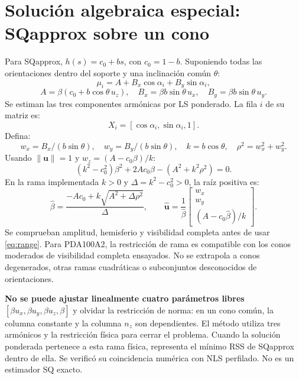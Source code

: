 \documentclass[11pt,a4paper]{article}
\begin{document}
\section{Solución algebraica especial: SQapprox sobre un cono}
Para SQapprox, $h(s)=c_0+bs$, con $c_0=1-b$. Suponiendo todas las orientaciones dentro del soporte y una inclinación común $\theta$:
\begin{equation}
 \mu_i=A+B_x\cos\alpha_i+B_y\sin\alpha_i,
\end{equation}
\begin{equation}
 A=\beta(c_0+b\cos\theta\,u_z),\quad
 B_x=\beta b\sin\theta\,u_x,\quad B_y=\beta b\sin\theta\,u_y.
\end{equation}
Se estiman las tres componentes armónicas por LS ponderado. La fila $i$ de su matriz es:
\begin{equation}
 X_i=[\cos\alpha_i,\sin\alpha_i,1].
\end{equation}
Defina:
\begin{equation}
 w_x=B_x/(b\sin\theta),\quad w_y=B_y/(b\sin\theta),\quad
 k=b\cos\theta,\quad \rho^2=w_x^2+w_y^2.
\end{equation}
Usando $\|\mathbf u\|=1$ y $w_z=(A-c_0\beta)/k$:
\begin{equation}
 (k^2-c_0^2)\beta^2+2Ac_0\beta-(A^2+k^2\rho^2)=0.
\end{equation}
En la rama implementada $k>0$ y $\Delta=k^2-c_0^2>0$, la raíz positiva es:
\begin{equation}
 \boxed{\hat\beta=\frac{-Ac_0+k\sqrt{A^2+\Delta\rho^2}}{\Delta}},\qquad
 \hat{\mathbf u}=\frac1{\hat\beta}\begin{bmatrix}w_x\\w_y\\(A-c_0\hat\beta)/k\end{bmatrix}.
\end{equation}
Se comprueban amplitud, hemisferio y visibilidad completa antes de usar \eqref{eq:range}. Para PDA100A2, la restricción de rama es compatible con los conos moderados de visibilidad completa ensayados. No se extrapola a conos degenerados, otras ramas cuadráticas o subconjuntos desconocidos de orientaciones.

\textbf{No se puede ajustar linealmente cuatro parámetros libres} $[\beta u_x,\beta u_y,\beta u_z,\beta]$ y olvidar la restricción de norma: en un cono común, la columna constante y la columna $n_z$ son dependientes. El método utiliza tres armónicos y la restricción física para cerrar el problema. Cuando la solución ponderada pertenece a esta rama física, representa el mínimo RSS de SQapprox dentro de ella. Se verificó su coincidencia numérica con NLS perfilado. No es un estimador SQ exacto.
\end{document}
